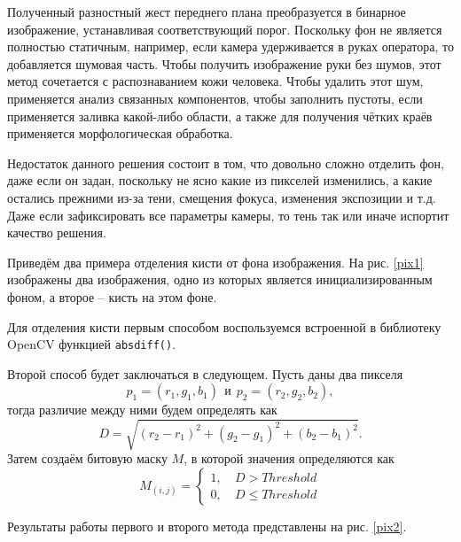 Полученный разностный жест переднего плана преобразуется в бинарное изображение, устанавливая
соответствующий порог. Поскольку фон не является полностью статичным, например, если камера
удерживается в руках оператора, то добавляется шумовая часть. Чтобы получить изображение руки
без шумов, этот метод сочетается с распознаванием кожи человека. Чтобы удалить этот шум, 
применяется анализ связанных компонентов, чтобы заполнить пустоты, если применяется заливка
какой-либо области, а также для получения чётких краёв применяется морфологическая обработка.

Недостаток данного решения состоит в том, что довольно сложно отделить фон, даже если он задан,
поскольку не ясно какие из пикселей изменились, а какие остались прежними из-за тени, смещения
фокуса, изменения экспозиции и т.д. Даже если зафиксировать все параметры камеры, то тень так
или иначе испортит качество решения.

Приведём два примера отделения кисти от фона изображения. На рис. \ref{pix1} изображены два
изображения, одно из которых является инициализированным фоном, а второе -- кисть на этом фоне.

Для отделения кисти первым способом воспользуемся встроенной в библиотеку OpenCV функцией
{\tt absdiff()}.

Второй способ будет заключаться в следующем. Пусть даны два пикселя 
\begin{equation}
	p_1 = (r_1, g_1, b_1)~~и~~p_2 = (r_2, g_2, b_2),
	\label{pixels_bg}
\end{equation}
тогда различие между ними будем определять как
\begin{equation}
	D = \sqrt{(r_2 - r_1)^2 + (g_2 - g_1)^2 + (b_2 - b_1)^2}.
	\label{distance}
\end{equation}
Затем создаём битовую маску $M$, в которой значения определяются как
\begin{equation}
	M_{(i,j)}=\left\{\begin{aligned}
	1,~& D > Threshold\\
	0,~& D \leq Threshold
\end{aligned}\right. 
\label{bite-mask}
\end{equation}

Результаты работы первого и второго метода представлены на рис. \ref{pix2}.

